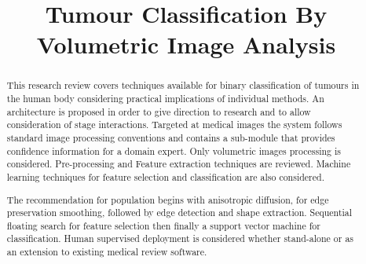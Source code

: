 \documentclass[journal]{IEEEtran}
\begin{document}
\title{Tumour Classification By Volumetric Image Analysis}
\author{
}


{}

\maketitle


\begin{abstract}

This research review covers techniques available for binary classification of tumours in the human body considering practical implications of individual methods.   
An architecture is proposed in order to give direction to research and to allow consideration of stage interactions.
Targeted at medical images the system follows standard image processing conventions and contains a sub-module that provides confidence information for a domain expert.  
Only volumetric images processing is considered.
Pre-processing and Feature extraction techniques are reviewed. 
Machine learning techniques for feature selection and classification are also considered. 

The recommendation for population begins with anisotropic diffusion, for edge preservation smoothing, followed by edge detection and shape extraction.
Sequential floating search for feature selection then finally a support vector machine for classification.
Human supervised deployment is considered whether stand-alone or as an extension to existing medical review software.

\end{abstract}










\IEEEpeerreviewmaketitle
\end{document}
